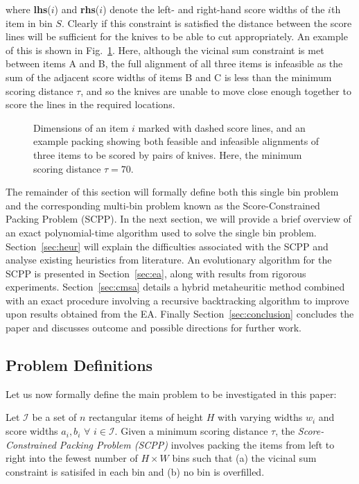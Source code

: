 \documentclass[authoryear]{elsarticle}
\begin{document}
\noindent where \textbf{lhs}($i$) and \textbf{rhs}($i$) denote the left- and right-hand score widths of the $i$th item in bin $S$. Clearly if this constraint is satisfied the distance between the score lines will be sufficient for the knives to be able to cut appropriately. An example of this is shown in Fig.~\ref{fig:itemsdimknives}. Here, although the vicinal sum constraint is met between items A and B, the full alignment of all three items is infeasible as the sum of the adjacent score widths of items B and C is less than the minimum scoring distance $\tau$, and so the knives are unable to move close enough together to score the lines in the required locations.
\begin{figure}[H]	
	\centering
	
	\caption{Dimensions of an item $i$ marked with dashed score lines, and an example packing showing both feasible and infeasible alignments of three items to be scored by pairs of knives. Here, the minimum scoring distance $\tau = 70$.}	
	\label{fig:itemsdimknives}
\end{figure}

\noindent The remainder of this section will formally define both this single bin problem and the corresponding multi-bin problem known as the Score-Constrained Packing Problem (SCPP). In the next section, we will provide a brief overview of an exact polynomial-time algorithm used to solve the single bin problem. Section~\ref{sec:heur} will explain the difficulties associated with the SCPP and analyse existing heuristics from literature. An evolutionary algorithm for the SCPP is presented in Section~\ref{sec:ea}, along with results from rigorous experiments. Section~\ref{sec:cmsa} details a hybrid metaheuritic method combined with an exact procedure involving a recursive backtracking algorithm to improve upon results obtained from the EA. Finally Section~\ref{sec:conclusion} concludes the paper and discusses outcome and possible directions for further work.

\subsection{Problem Definitions}
\label{sub:intro}

\noindent Let us now formally define the main problem to be investigated in this paper:

\begin{definition}
	Let $\mathcal{I}$ be a set of $n$ rectangular items of height $H$ with varying widths $w_i$ and score widths $a_i, b_i$ $\forall$ $i \in \mathcal{I}$. Given a minimum scoring distance $\tau$, the \emph{Score-Constrained Packing Problem (SCPP)} involves packing the items from left to right into the fewest number of $H \times W$ bins such that (a) the vicinal sum constraint is satisifed in each bin and (b) no bin is overfilled.
	\label{defn:scpp}
\end{definition}	
\end{document}
